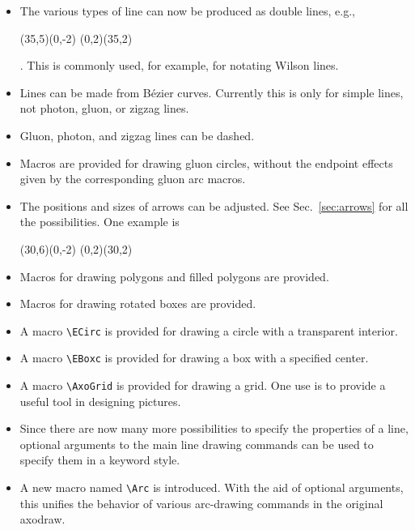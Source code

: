 \documentclass[12pt]{article}
\begin{document}
\begin{itemize}
\item The various types of line can now be produced as double lines,
  e.g.,
  \begin{axopicture}(35,5)(0,-2)
    \Line[double,sep=2.5](0,2)(35,2)
  \end{axopicture}.
  This is commonly used, for example, for notating Wilson lines. 

\item Lines can be made from B\'ezier curves.
  Currently this is only for simple lines, not photon, gluon, or
  zigzag lines.

\item Gluon, photon, and zigzag lines can be dashed.

\item Macros are provided for drawing gluon circles, without the
  endpoint effects given by the corresponding gluon arc macros.

\item The positions and sizes of arrows can be adjusted.  See Sec.\
  \ref{sec:arrows} for all the possibilities.  One example is 
  \begin{axopicture}(30,6)(0,-2)
    \Line[arrow,arrowpos=0.8](0,2)(30,2)
  \end{axopicture}

\item Macros for drawing polygons and filled polygons are provided.

\item Macros for drawing rotated boxes are provided.

\item A macro \verb+\ECirc+ is provided for drawing a circle with a
  transparent interior.

\item A macro \verb+\EBoxc+ is provided for drawing a box with a
  specified center.

\item A macro \verb+\AxoGrid+ is provided for drawing a grid.  One
  use is to provide a useful tool in designing pictures.

\item Since there are now many more possibilities to specify the
  properties of a line, optional arguments to the main line drawing
  commands can be used to specify them in a keyword style.  

\item A new macro named \verb+\Arc+ is introduced.  With the aid of
  optional arguments, this unifies the behavior of various arc-drawing
  commands in the original axodraw.


\end{itemize}
\end{document}

